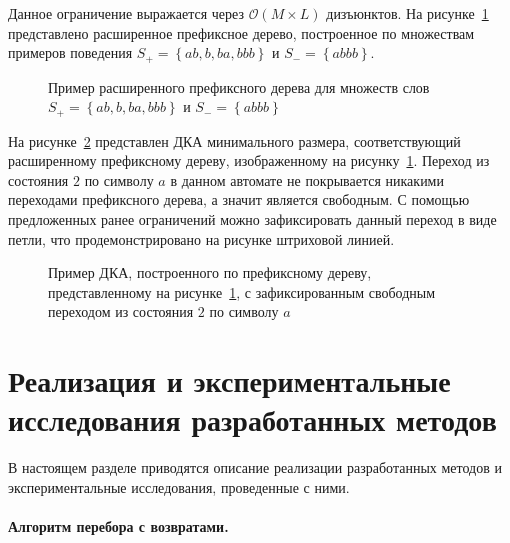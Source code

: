 Данное ограничение выражается через $\mathcal{O}\left(M\times L\right)$ дизъюнктов.
На рисунке~\ref{img:apta-loop} представлено расширенное префиксное дерево, построенное по множествам примеров поведения $S_{+}=\left\{ab,b,ba,bbb\right\}$ и $S_{-}=\left\{abbb\right\}$.
%
\begin{figure}[ht]
  \centering
  \ifafour
    
  \else
    
  \fi
  \caption{Пример расширенного префиксного дерева для множеств слов $S_{+}=\left\{ab,b,ba,bbb\right\}$ и $S_{-}=\left\{abbb\right\}$}
  \label{img:apta-loop}
\end{figure}
%
На рисунке~\ref{img:dfa-loop} представлен ДКА минимального размера, соответствующий расширенному префиксному дереву, изображенному на рисунку~\ref{img:apta-loop}.
Переход из состояния $2$ по символу $a$ в данном автомате не покрывается никакими переходами префиксного дерева, а значит является свободным.
С помощью предложенных ранее ограничений можно зафиксировать данный переход в виде петли, что продемонстрировано на рисунке штриховой линией.
%
\begin{figure}[ht]
  \centering
  \ifafour
    
  \else
    
  \fi
  \caption{Пример ДКА, построенного по префиксному дереву, представленному на рисунке~\ref{img:apta-loop}, с зафиксированным свободным переходом из состояния $2$ по символу $a$}
  \label{img:dfa-loop}
\end{figure}


\section{Реализация и экспериментальные исследования разработанных методов}
\label{sec:findall:results}

В настоящем разделе приводятся описание реализации разработанных методов и экспериментальные исследования, проведенные с ними.


\paragraph*{Алгоритм перебора с возвратами.}
\label{sec:findall:results:backtracking}

